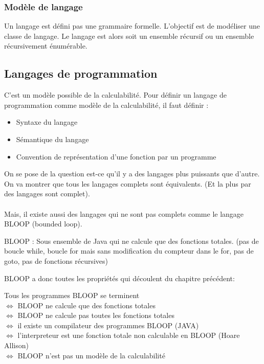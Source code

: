 \subsubsection{Modèle de langage}
\label{ssub:mod_le_de_langage}
Un langage est défini pas une grammaire formelle. L'objectif est de modéliser 
une classe de langage. Le langage est alors soit un ensemble récursif ou un 
ensemble récursivement énumérable.


\subsection{Langages de programmation}
\label{sub:langages_de_programmation}
C'est un modèle possible de la calculabilité. Pour définir un langage de 
programmation comme modèle de la calculabilité, il faut définir : 
\begin{itemize}
	\item Syntaxe du langage
	\item Sémantique du langage
	\item Convention de représentation d'une fonction par un programme
\end{itemize}

On se pose de la question est-ce qu'il y a des langages plus puissants que 
d'autre. On va montrer que tous les langages complets sont équivalents. (Et la 
plus par des langages sont complet).

\paragraph{} Mais, il existe aussi des langages qui ne sont pas complets comme le 
langage BLOOP (bounded loop).

\begin{mydef}
	BLOOP : Sous ensemble de Java qui ne calcule que des fonctions totales. 
	(pas de boucle while, boucle for mais sans modification du compteur 
	dans le for, pas de goto, pas de fonctions récursives)
\end{mydef}

BLOOP a donc toutes les propriétés qui découlent du chapitre précédent:

\begin{myprop}
	Tous les programmes BLOOP se terminent\\
	$ \Leftrightarrow$ BLOOP ne calcule que des fonctions totales\\
	$ \Leftrightarrow$ BLOOP ne calcule pas toutes les fonctions totales\\
	$ \Leftrightarrow$ il existe un compilateur des programmes BLOOP (JAVA)\\
	$ \Leftrightarrow$ l'interpreteur est une fonction totale non calculable en
BLOOP (Hoare Allison)\\
	$ \Leftrightarrow$ BLOOP n'est pas un modèle de la calculabilité\\
\end{myprop}

